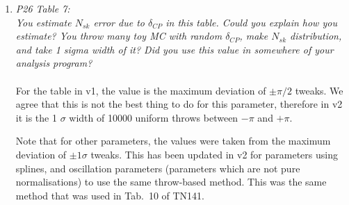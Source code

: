 \begin{enumerate}
  It is difficult to present a simple argument to confirm that $f_{\pi-less\Delta; t, r}$ is behaving correctly
  since it has both an $E_{reco}$ and $E_{true}$ dependence.

  It should be noted that the prefit column of Tab.\ 10 of TN141
  is a direct copy of the postfit column, for all but the BANFF parameters.


  \vspace{5 mm}
\item
  {\em
    P26 Table 7:\\
    You estimate $N_{sk}$ error due to $\delta_{CP}$ in this table. Could you explain how you estimate?
    You throw many toy MC with random $\delta_{CP}$, make $N_{sk}$ distribution, and take 1 sigma width of it? 
    Did you use this value in somewhere of your analysis program?
  }\\
  \\
  For the table in v1, the value is the maximum deviation of $\pm\pi/2$ tweaks.
  We agree that this is not the best thing to do for this parameter,
  therefore in v2 it is the 1 $\sigma$ width of 10000 uniform throws between $-\pi$ and $+\pi$.
  
  Note that for other parameters, the values were taken from the maximum deviation of $\pm1\sigma$ tweaks.
  This has been updated in v2 for parameters using splines, and oscillation parameters
  (parameters which are not pure normalisations)
  to use the same throw-based method.
  This was the same method that was used in Tab.\ 10 of TN141.
  


\end{enumerate}
